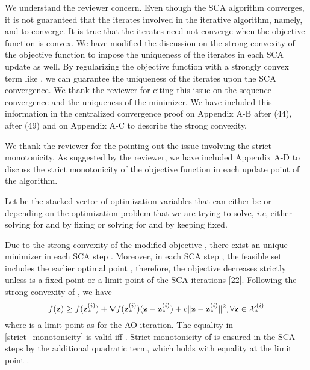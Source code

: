 \begin{enumerate}
\resp We understand the reviewer concern. Even though the \ac{SCA} algorithm converges, it is not guaranteed that the iterates involved in the iterative algorithm, namely,  and  to converge. It is true that the iterates need not converge when the objective function is convex. We have modified the discussion on the strong convexity of the objective function to impose the uniqueness of the iterates in each \ac{SCA} update as well. By regularizing the objective function with a strongly convex term like , we can guarantee the uniqueness of the iterates upon the \ac{SCA} convergence. We thank the reviewer for citing this issue on the sequence convergence and the uniqueness of the minimizer. We have included this information in the centralized convergence proof on Appendix A-B after (44), after (49) and on Appendix A-C to describe the strong convexity.

  

\resp We thank the reviewer for the pointing out the issue involving the strict monotonicity. As suggested by the reviewer, we have included Appendix A-D to discuss the strict monotonicity of the objective function in each update point of the algorithm. 

Let  be the stacked vector of optimization variables that can either be  or  depending on the optimization problem that we are trying to solve, \textit{i.e}, either solving for \eqn{\mx} and \eqn{\mz} by fixing  or solving for \eqn{\my} and \eqn{\mz} by keeping  fixed. 

Due to the strong convexity of the modified objective , there exist an unique minimizer in each \ac{SCA} step . Moreover, in each \ac{SCA} step , the feasible set  includes the earlier optimal point , therefore, the objective decreases strictly unless  is a fixed point or a limit point of the \ac{SCA} iterations [22]. Following the strong convexity of , we have
\begin{equation} \label{strict_monotonicity}
f(\mathbf{z}) \geq f(\mathbf{z}_{\ast}^{(i)}) + \nabla f(\mathbf{z}_{\ast}^{(i)}) (\mathbf{z} - \mathbf{z}_{\ast}^{(i)}) + c \|\mathbf{z} - \mathbf{z}_{\ast}^{(i)}\|^2, \forall \mathbf{z}\in \mathcal{X}^{(i)}_\ast
\end{equation}
where  is a limit point as  for the  \ac{AO} iteration. The equality in \eqref{strict_monotonicity} is valid iff . Strict monotonicity of  is ensured in the \ac{SCA} steps by the additional quadratic term, which holds with equality at the limit point .


\end{enumerate}
